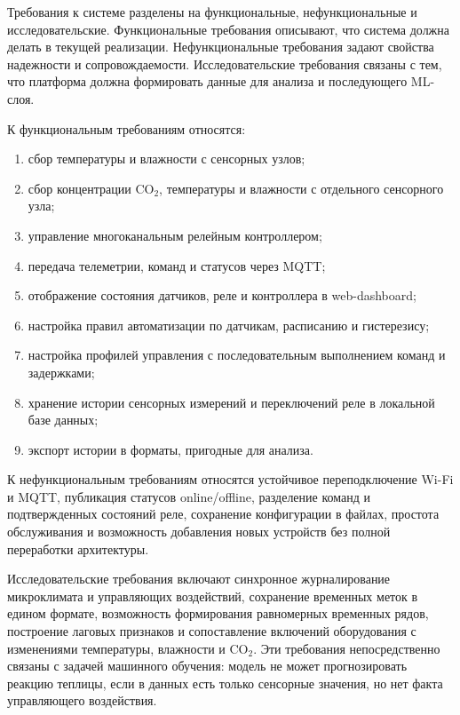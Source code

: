 \documentclass[a4paper,14pt]{extarticle}
\providecommand{\tightlist}{%
  \setlength{\itemsep}{0pt}\setlength{\parskip}{0pt}}
\begin{document}
Требования к системе разделены на функциональные, нефункциональные и
исследовательские. Функциональные требования описывают, что система
должна делать в текущей реализации. Нефункциональные требования задают
свойства надежности и сопровождаемости. Исследовательские требования
связаны с тем, что платформа должна формировать данные для анализа и
последующего ML-слоя.

К функциональным требованиям относятся:

\begin{enumerate}
\def\labelenumi{\arabic{enumi})}
\tightlist
\item
  сбор температуры и влажности с сенсорных узлов;
\item
  сбор концентрации CO\(_2\), температуры и влажности с отдельного
  сенсорного узла;
\item
  управление многоканальным релейным контроллером;
\item
  передача телеметрии, команд и статусов через MQTT;
\item
  отображение состояния датчиков, реле и контроллера в web-dashboard;
\item
  настройка правил автоматизации по датчикам, расписанию и гистерезису;
\item
  настройка профилей управления с последовательным выполнением команд и
  задержками;
\item
  хранение истории сенсорных измерений и переключений реле в локальной
  базе данных;
\item
  экспорт истории в форматы, пригодные для анализа.
\end{enumerate}

К нефункциональным требованиям относятся устойчивое переподключение
Wi-Fi и MQTT, публикация статусов online/offline, разделение команд и
подтвержденных состояний реле, сохранение конфигурации в файлах,
простота обслуживания и возможность добавления новых устройств без
полной переработки архитектуры.

Исследовательские требования включают синхронное журналирование
микроклимата и управляющих воздействий, сохранение временных меток в
едином формате, возможность формирования равномерных временных рядов,
построение лаговых признаков и сопоставление включений оборудования с
изменениями температуры, влажности и CO\(_2\). Эти требования
непосредственно связаны с задачей машинного обучения: модель не может
прогнозировать реакцию теплицы, если в данных есть только сенсорные
значения, но нет факта управляющего воздействия.
\end{document}
